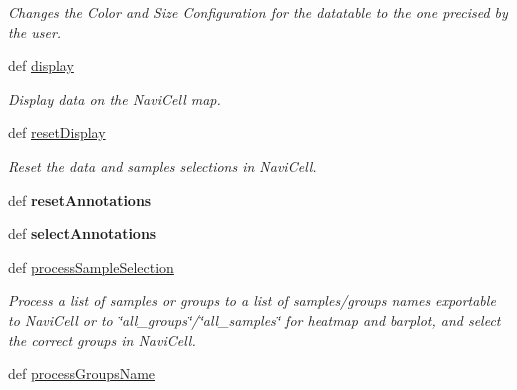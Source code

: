 \begin{DoxyCompactItemize}
\begin{DoxyCompactList}\small\item\em Changes the Color and Size Configuration for the datatable to the one precised by the user. \item\end{DoxyCompactList}\item 
def \hyperlink{classnavicom_1_1navicom_1_1NaviCom_ad7d4390d700d4a6d2533647887f8ab94}{display}
\begin{DoxyCompactList}\small\item\em Display data on the NaviCell map. \item\end{DoxyCompactList}\item 
\hypertarget{classnavicom_1_1navicom_1_1NaviCom_a379f15a87ba5c41c3501e9f386102c05}{
def \hyperlink{classnavicom_1_1navicom_1_1NaviCom_a379f15a87ba5c41c3501e9f386102c05}{resetDisplay}}
\label{classnavicom_1_1navicom_1_1NaviCom_a379f15a87ba5c41c3501e9f386102c05}

\begin{DoxyCompactList}\small\item\em Reset the data and samples selections in NaviCell. \item\end{DoxyCompactList}\item 
\hypertarget{classnavicom_1_1navicom_1_1NaviCom_ab92b6e95417e01126d9d73903acc2a3b}{
def {\bfseries resetAnnotations}}
\label{classnavicom_1_1navicom_1_1NaviCom_ab92b6e95417e01126d9d73903acc2a3b}

\item 
\hypertarget{classnavicom_1_1navicom_1_1NaviCom_ad298207a958acd2cee82c7df7eace0d3}{
def {\bfseries selectAnnotations}}
\label{classnavicom_1_1navicom_1_1NaviCom_ad298207a958acd2cee82c7df7eace0d3}

\item 
\hypertarget{classnavicom_1_1navicom_1_1NaviCom_a6536cf86235df90cb7443c23f11870e4}{
def \hyperlink{classnavicom_1_1navicom_1_1NaviCom_a6536cf86235df90cb7443c23f11870e4}{processSampleSelection}}
\label{classnavicom_1_1navicom_1_1NaviCom_a6536cf86235df90cb7443c23f11870e4}

\begin{DoxyCompactList}\small\item\em Process a list of samples or groups to a list of samples/groups names exportable to NaviCell or to \char`\"{}all\_\-groups\char`\"{}/\char`\"{}all\_\-samples\char`\"{} for heatmap and barplot, and select the correct groups in NaviCell. \item\end{DoxyCompactList}\item 
\hypertarget{classnavicom_1_1navicom_1_1NaviCom_af04ea16f3ccb0d883f5b01471c0c1a6f}{
def \hyperlink{classnavicom_1_1navicom_1_1NaviCom_af04ea16f3ccb0d883f5b01471c0c1a6f}{processGroupsName}}
\label{classnavicom_1_1navicom_1_1NaviCom_af04ea16f3ccb0d883f5b01471c0c1a6f}


\end{DoxyCompactItemize}
